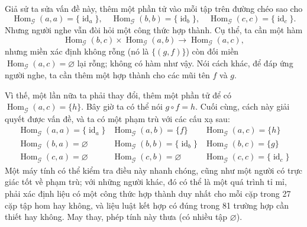 Giả sử ta sửa vấn đề này, thêm một phần tử vào mỗi tập trên đường chéo sao cho
\[\operatorname{Hom}_{\mathcal G}(a,a)=\{\operatorname{id}_a\},\quad\operatorname{Hom}_{\mathcal G}(b,b)=\{\operatorname{id}_b\},\quad\operatorname{Hom}_{\mathcal G}(c,c)=\{\operatorname{id}_c\}.\]
Nhưng người nghe vẫn đòi hỏi một công thức hợp thành. Cụ thể, ta cần một hàm
\[\operatorname{Hom}_{\mathcal G}(b,c)\times\operatorname{Hom}_{\mathcal G}(a,b)\longrightarrow\operatorname{Hom}_{\mathcal G}(a,c),\]
nhưng miền xác định không rỗng (nó là $\{(g,f)\}$) còn đối miền $\operatorname{Hom}_{\mathcal G}(a,c)=\varnothing$ lại rỗng; không có hàm như vậy. Nói cách khác, để đáp ứng người nghe, ta cần thêm một hợp thành cho các mũi tên $f$ và $g$.

Vì thế, một lần nữa ta phải thay đổi, thêm một phần tử để có $\operatorname{Hom}_{\mathcal G}(a,c)=\{h\}$. Bây giờ ta có thể nói $g\circ f=h$. Cuối cùng, cách này giải quyết được vấn đề, và ta có một phạm trù với các cấu xạ sau:
\[\begin{array}{lll}
\operatorname{Hom}_{\mathcal G}(a,a)=\{\operatorname{id}_a\}&\operatorname{Hom}_{\mathcal G}(a,b)=\{f\}&\operatorname{Hom}_{\mathcal G}(a,c)=\{h\}\\
\operatorname{Hom}_{\mathcal G}(b,a)=\varnothing&\operatorname{Hom}_{\mathcal G}(b,b)=\{\operatorname{id}_b\}&\operatorname{Hom}_{\mathcal G}(b,c)=\{g\}\\
\operatorname{Hom}_{\mathcal G}(c,a)=\varnothing&\operatorname{Hom}_{\mathcal G}(c,b)=\varnothing&\operatorname{Hom}_{\mathcal G}(c,c)=\{\operatorname{id}_c\}
\end{array}\]
Một máy tính có thể kiểm tra điều này nhanh chóng, cũng như một người có trực giác tốt về phạm trù; với những người khác, đó có thể là một quá trình tỉ mỉ, phải xác định liệu có một công thức hợp thành duy nhất cho mỗi cặp trong 27 cặp tập hom hay không, và liệu luật kết hợp có đúng trong 81 trường hợp cần thiết hay không. May thay, phép tính này thưa (có nhiều tập $\varnothing$).

